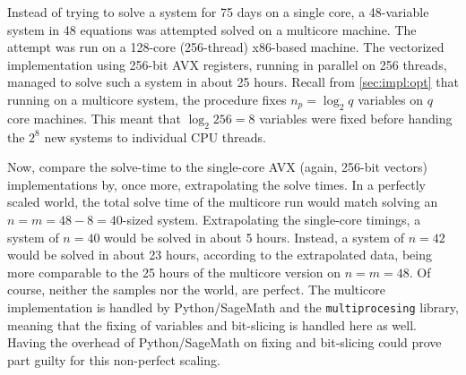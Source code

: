 Instead of trying to solve a system for 75 days on a single core, a 48-variable system in 48 equations was attempted solved on a multicore machine. The attempt was run on a 128-core (256-thread) x86-based machine. The vectorized implementation using 256-bit AVX registers, running in parallel on 256 threads, managed to solve such a system in about 25 hours. Recall from \cref{sec:impl:opt} that running on a multicore system, the procedure fixes $n_p = \log_2 q$ variables on $q$ core machines. This meant that $\log_2 256 = 8$ variables were fixed before handing the $2^8$ new systems to individual CPU threads. 

Now, compare the solve-time to the single-core AVX (again, 256-bit vectors) implementations by, once more, extrapolating the solve times. In a perfectly scaled world, the total solve time of the multicore run would match solving an $n = m = 48 - 8 = 40$-sized system. Extrapolating the single-core timings, a system of $n = 40$ would be solved in about 5 hours. Instead, a system of $n = 42$ would be solved in about 23 hours, according to the extrapolated data, being more comparable to the 25 hours of the multicore version on $n = m = 48$. Of course, neither the samples nor the world, are perfect. The multicore implementation is handled by Python/SageMath and the \texttt{multiprocesing} library, meaning that the fixing of variables and bit-slicing is handled here as well. Having the overhead of Python/SageMath on fixing and bit-slicing could prove part guilty for this non-perfect scaling. 

\newpage